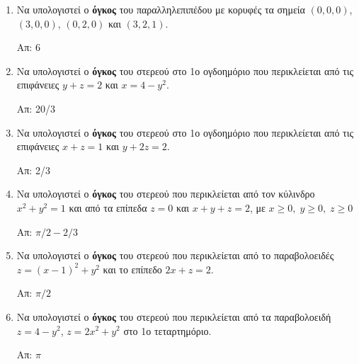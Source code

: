  \begin{enumerate}
  \item Να υπολογιστεί ο \textbf{όγκος} του παραλληλεπιπέδου με κορυφές τα σημεία 
    $ (0,0,0) $, $ (3,0,0) $, $ (0,2,0) $ και $ (3,2,1) $. 

    \hfill Απ: 6

  \item Να υπολογιστεί ο \textbf{όγκος} του στερεού στο 1ο ογδοημόριο που περικλείεται 
    από τις επιφάνειες $y+z=2$ και $x=4-y^{2}$. 

    \hfill Απ: 20/3 

  \item Να υπολογιστεί ο \textbf{όγκος} του στερεού στο 1ο ογδοημόριο που περικλείεται 
    από τις επιφάνειες $ x+z=1 $ και $ y+2z=2 $. 

    \hfill Απ: 2/3 

  \item Να υπολογιστεί ο \textbf{όγκος} του στερεού που περικλείεται από τον κύλινδρο 
    $ x^{2}+y^{2}=1 $ και από τα επίπεδα $ z=0 $ και $ x+y+z=2 $, με 
    $ x \geq 0, \; y \geq 0, \; z \geq 0$ 

    \hfill Απ: $ {\pi}/{2} - {2}/{3} $ 

  \item Να υπολογιστεί ο \textbf{όγκος} του στερεού που περικλείεται από το 
    παραβολοειδές  $ z = (x-1)^{2}+y^{2} $ και το επίπεδο $ 2x+z=2 $.
   
    \hfill Απ: $ {\pi}/{2} $

  \item Να υπολογιστεί ο \textbf{όγκος} του στερεού που περικλείεται από τα παραβολοειδή 
    $ z = 4 -y^{2} $, $ z = 2x^{2}+y^{2} $ στο 1ο τεταρτημόριο. 
   
    \hfill Απ: $ \pi $ 
\end{enumerate}



